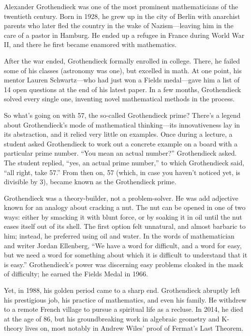 \documentclass{article}
\begin{document}
\begin{multicols}{3}
Alexander Grothendieck was one of the most prominent mathematicians of the twentieth century. Born in 1928, he grew up in the city of Berlin with anarchist parents who later fled the country in the wake of Nazism—leaving him in the care of a pastor in Hamburg. He ended up a refugee in France during World War II, and there he first became enamored with mathematics.

After the war ended, Grothendieck formally enrolled in college. There, he failed some of his classes (astronomy was one), but excelled in math. At one point, his mentor Lauren Schwartz—who had just won a Fields medal—gave him a list of 14 open questions at the end of his latest paper. In a few months, Grothendieck solved every single one, inventing novel mathematical methods in the process.

So what’s going on with 57, the so-called Grothendieck prime? There’s a legend about Grothendieck’s mode of mathematical thinking—its innovativeness lay in its abstraction, and it relied very little on examples. Once during a lecture, a student asked Grothendieck to work out a concrete example on a board with a particular prime number. “You mean an actual number?” Grothendieck asked. The student replied, “yes, an actual prime number,” to which Grothendieck said, “all right, take 57.” From then on, 57 (which, in case you haven’t noticed yet, is divisible by 3), became known as the Grothendieck prime.


Grothendieck was a theory-builder, not a problem-solver. He was add adjective known for an analogy about cracking a nut. The nut can be opened in one of two ways: either by smacking it with blunt force, or by soaking it in oil until the nut eases itself out of its shell. The first option felt unnatural, and almost barbaric to him; instead, he preferred using oil and water. In the words of mathematician and writer Jordan Ellenberg, “We have a word for difficult, and a word for easy, but we need a word for something about which it is difficult to understand that it is easy.” Grothendieck’s power was discerning easy problems cloaked in the mask of difficulty; he earned the Fields Medal in 1966.

Yet, in 1988, his golden period came to a sharp end. Grothendieck abruptly left his prestigious job, his practice of mathematics, and even his family. He withdrew to a remote French village to pursue a spiritual life as a recluse. In 2014, he died at the age of 86, but his groundbreaking work in algebraic geometry and K-theory lives on, most notably in Andrew Wiles’ proof of Fermat’s Last Theorem.


\end{multicols}
\end{document}
